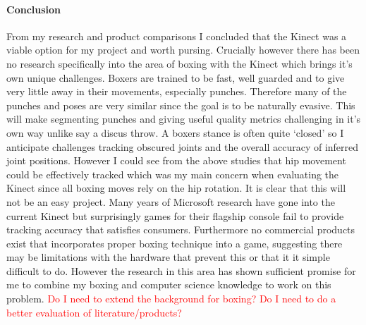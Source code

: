 \paragraph{Conclusion}
From my research and product comparisons I concluded that the Kinect was a viable option for my project and worth pursing. Crucially however there has been no research specifically into the area of boxing with the Kinect which brings it's own unique challenges. Boxers are trained to be fast, well guarded and to give very little away in their movements, especially punches. Therefore many of the punches and poses are very similar since the goal is to be naturally evasive. This will make segmenting punches and giving useful quality metrics challenging in it's own way unlike say a discus throw. A boxers stance is often quite `closed' so I anticipate challenges tracking obscured joints and the overall accuracy of inferred joint positions. However I could see from the above studies that hip movement could be effectively tracked which was my main concern when evaluating the Kinect since all boxing moves rely on the hip rotation.
\newline\newline 
It is clear that this will not be an easy project. Many years of Microsoft research have gone into the current Kinect but surprisingly games for their flagship console fail to provide tracking accuracy that satisfies consumers. Furthermore no commercial products exist that incorporates proper boxing technique into a game, suggesting there may be limitations with the hardware that prevent this or that it it simple difficult to do. However the research in this area has shown sufficient promise for me to combine my boxing and computer science knowledge to work on this problem.
\textcolor{red}{Do I need to extend the background for boxing?}
\textcolor{red}{Do I need to do a better evaluation of literature/products?}